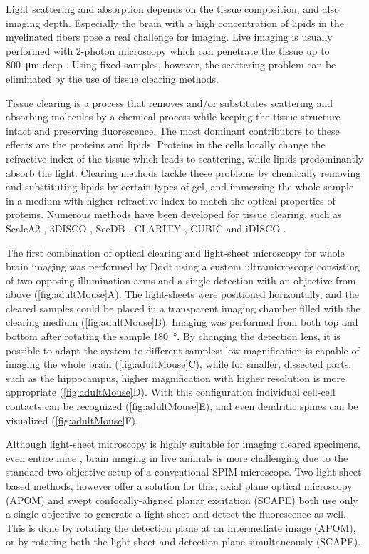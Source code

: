     Light scattering and absorption depends on the tissue composition, and also imaging depth. Especially the brain with a high concentration of lipids in the myelinated fibers pose a real challenge for imaging. Live imaging is usually performed with 2-photon microscopy which can penetrate the tissue up to \SI{800}{\micro m} deep \cite{katona_fast_2012}. Using fixed samples, however, the scattering problem can be eliminated by the use of tissue clearing methods.

    Tissue clearing is a process that removes and/or substitutes scattering and absorbing molecules by a chemical process while keeping the tissue structure intact and preserving fluorescence. The most dominant contributors to these effects are the proteins and lipids. Proteins in the cells locally change the refractive index of the tissue which leads to scattering, while lipids predominantly absorb the light. Clearing methods tackle these problems by chemically removing and substituting lipids by certain types of gel, and immersing the whole sample in a medium with higher refractive index to match the optical properties of proteins. Numerous methods have been developed for tissue clearing, such as ScaleA2 \cite{hama_scale:_2011}, 3DISCO \cite{erturk_three-dimensional_2012,erturk_three-dimensional_2012-1}, SeeDB \cite{ke_seedb:_2013}, CLARITY \cite{chung_clarity_2013}, CUBIC \cite{susaki_whole-brain_2014} and iDISCO \cite{renier_idisco:_2014}.

    The first combination of optical clearing and light-sheet microscopy for whole brain imaging was performed by Dodt \etal using a custom ultramicroscope consisting of two opposing illumination arms and a single detection with an objective from above (\autoref{fig:adultMouse}A). The light-sheets were positioned horizontally, and the cleared samples could be placed in a transparent imaging chamber filled with the clearing medium (\autoref{fig:adultMouse}B). Imaging was performed from both top and bottom after rotating the sample \SI{180}{\degree}. By changing the detection lens, it is possible to adapt the system to different samples: low magnification is capable of imaging the whole brain (\autoref{fig:adultMouse}C), while for smaller, dissected parts, such as the hippocampus, higher magnification with higher resolution is more appropriate (\autoref{fig:adultMouse}D). With this configuration individual cell-cell contacts can be recognized (\autoref{fig:adultMouse}E), and even dendritic spines can be visualized (\autoref{fig:adultMouse}F).

    Although light-sheet microscopy is highly suitable for imaging cleared specimens, even entire mice \cite{tainaka_whole-body_2014}, brain imaging in live animals is more challenging due to the standard two-objective setup of a conventional SPIM microscope. Two light-sheet based methods, however offer a solution for this, axial plane optical microscopy (APOM) \cite{li_axial_2014} and swept confocally-aligned planar excitation (SCAPE) \cite{bouchard_swept_2015} both use only a single objective to generate a light-sheet and detect the fluorescence as well. This is done by rotating the detection plane at an intermediate image (APOM), or by rotating both the light-sheet and detection plane simultaneously (SCAPE).


